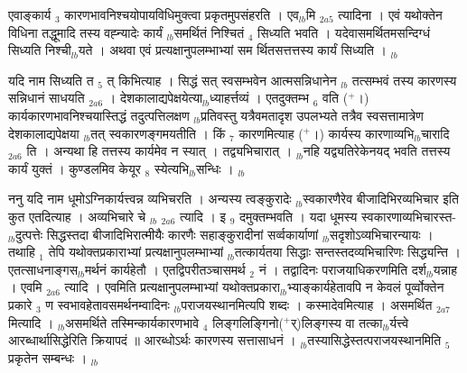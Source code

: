\documentclass[article,12pt,a4paper]{memoir}%
\newcommand{\add}[1]{($^{+}$#1)}
\newcounter{parCount}
\begin{document}
	  
	  \pstart \leavevmode%
	एवाङ्कार्य {\tiny $_{3}$} कारणभावनिश्चयोपायविधिमुक्त्वा प्रकृतमुपसंहरति । {\color{DodgerBlue3}एव{\tiny $_{lb}$}मि} {\tiny $_{2a5}$} त्यादिना । एवं यथोक्तेन विधिना तद्धूमादि तस्य वह्न्यादेः {\color{DodgerBlue3}कार्यं {\tiny $_{lb}$}समर्थितं} निश्चितं {\tiny $_{4}$} सिध्यति भवति । यदेवासमर्थितमसन्दिग्धं सिध्यति निश्ची{\tiny $_{lb}$}यते । अथवा एवं प्रत्यक्षानुपलम्भाभ्यां सम र्थितसत्तत्तस्य कार्यं सिध्यति ।
	{}
	\pend%
      {\tiny $_{lb}$}

	  
	  \pstart \leavevmode%
	यदि नाम सिध्यति त {\tiny $_{5}$} त् किभित्याह । {\color{DodgerBlue3}सिद्धं सत् स्वसम्भवेन} आत्मसन्निधानेन {\tiny $_{lb}$} {\color{DodgerBlue3}तत्सम्भवं} तस्य कारणस्य सन्निधानं साधयति {\tiny $_{2a6}$} । देशकालाद्यपेक्षयेत्या{\tiny $_{lb}$}ध्याहर्त्तव्यं । एतदुक्तम्भ {\tiny $_{6}$} वति \add{।} कार्यकारणभावनिश्चयास्तिद्धं तदुत्पत्तिलक्षण {\tiny $_{lb}$}प्रतिवस्तु यत्रैवमतादृश उपलभ्यते तत्रैव स्वसत्तामात्रेण देशकालाद्यपेक्षया {\tiny $_{lb}$}तत् स्वकारणङ्गमयतीति । किं {\tiny $_{7}$} कारणमित्याह \add{।} {\color{DodgerBlue3}कार्यस्य कारणाव्यभि{\tiny $_{lb}$}चारादि} {\tiny $_{2a6}$} ति । अन्यथा हि तत्तस्य कार्यमेव न स्यात् । तद्व्यभिचारात् । {\tiny $_{lb}$}नहि यद्व्यतिरेकेनयद् भवति तत्तस्य कार्यं युक्तं । कुण्डलमिव केयूर {\tiny $_{8}$} स्येत्यभि{\tiny $_{lb}$}सन्धिः ।
	{}
	\pend%
      {\tiny $_{lb}$}

	  
	  \pstart \leavevmode%
	ननु यदि नाम धूमोऽग्निकार्यत्त्वन्न व्यभिचरति । अन्यस्य त्वङ्कुरादेः {\tiny $_{lb}$}स्वकारणैरेव बीजादिभिरव्यभिचार इति कुत एतदित्याह । {\color{DodgerBlue3}अव्यभिचारे चे} {\tiny $_{lb}$} {\tiny $_{2a6}$} त्यादि । इ {\tiny $_{9}$} \leavevmode{} दमुक्तम्भवति । यदा धूमस्य स्वकारणाव्यभिचारस्त- {\tiny $_{lb}$}दुत्पत्तेः सिद्धस्तदा बीजादिभिरात्मीयैः कारणैः सहाङ्कुरादीनां सर्व्वकार्याणां {\tiny $_{lb}$}सदृशोऽव्यभिचारन्यायः । तथाहि {\tiny $_{1}$} तेपि यथोक्तप्रकाराभ्यां प्रत्यक्षानुपलम्भाभ्यां {\tiny $_{lb}$}तत्कार्यतया सिद्धाः सन्तस्तदव्यभिचारिणः सिद्ध्यन्ति । एतत्साधनाङ्गस{\tiny $_{lb}$}मर्थनं कार्यहेतौ । एतद्विपरीतञ्चासमर्थ {\tiny $_{2}$} नं । तद्वादिनः पराजयाधिकरणमिति दर्श{\tiny $_{lb}$}यन्नाह । {\color{DodgerBlue3}एवमि} {\tiny $_{2a6}$} त्यादि । एवमिति प्रत्यक्षानुपलम्भाभ्यां यथोक्तप्रकारा{\tiny $_{lb}$}भ्याङ्कार्यहेतावपि न केवलं पूर्व्वोक्तेन प्रकारे {\tiny $_{3}$} ण स्वभावहेतावसमर्थनम्वादिनः {\tiny $_{lb}$}पराजयस्थानमित्यपि शब्दः । कस्मादेवमित्याह । {\color{DodgerBlue3}असमर्थित} {\tiny $_{2a7}$} मित्यादि । {\tiny $_{lb}$}असमर्थिते तस्मिन्कार्यकारणभावे {\tiny $_{4}$} लिङ्गलिङ्गिनो\add{र्}लिङ्गस्य वा तत्का{\tiny $_{lb}$}र्यत्त्वे आरब्धार्थासिद्धेरिति क्रियापदं ॥ आरब्धोऽर्थः कारणस्य सत्तासाधनं । {\tiny $_{lb}$}तस्यासिद्धेस्तत्पराजयस्थानमिति {\tiny $_{5}$} प्रकृतेन सम्बन्धः ।
	{}
	\pend%
      {\tiny $_{lb}$}
\end{document}
